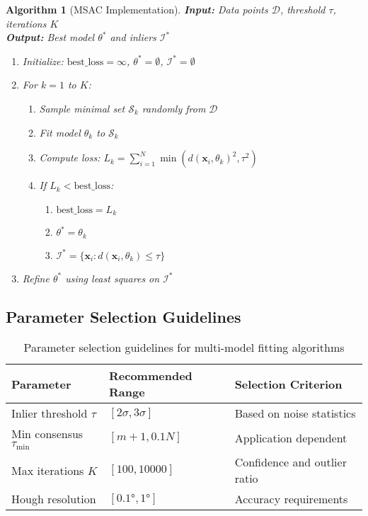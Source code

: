 \documentclass[12pt]{article}
\renewcommand{\vec}[1]{\mathbf{#1}}
\newtheorem{algorithm}[theorem]{Algorithm}
\begin{document}
\begin{algorithm}[MSAC Implementation]
    \label{alg:msac_detailed}
    \textbf{Input:} Data points $\mathcal{D}$, threshold $\tau$, iterations $K$\\
    \textbf{Output:} Best model $\theta^*$ and inliers $\mathcal{I}^*$
    \begin{enumerate}
        \item Initialize: $\text{best\_loss} = \infty$, $\theta^* = \emptyset$, $\mathcal{I}^* = \emptyset$
        \item For $k = 1$ to $K$:
              \begin{enumerate}
                  \item Sample minimal set $\mathcal{S}_k$ randomly from $\mathcal{D}$
                  \item Fit model $\theta_k$ to $\mathcal{S}_k$
                  \item Compute loss: $L_k = \sum_{i=1}^N \min(d(\vec{x}_i, \theta_k)^2, \tau^2)$
                  \item If $L_k < \text{best\_loss}$:
                        \begin{enumerate}
                            \item $\text{best\_loss} = L_k$
                            \item $\theta^* = \theta_k$
                            \item $\mathcal{I}^* = \{\vec{x}_i : d(\vec{x}_i, \theta_k) \leq \tau\}$
                        \end{enumerate}
              \end{enumerate}
        \item Refine $\theta^*$ using least squares on $\mathcal{I}^*$
    \end{enumerate}
\end{algorithm}

\subsection{Parameter Selection Guidelines}
\label{app:parameter_guidelines}

\begin{table}[h]
    \centering
    \begin{tabular}{lll}
        \toprule
        \textbf{Parameter}          & \textbf{Recommended Range} & \textbf{Selection Criterion} \\
        \midrule
        Inlier threshold $\tau$     & $[2\sigma, 3\sigma]$       & Based on noise statistics    \\
        Min consensus $\tau_{\min}$ & $[m+1, 0.1N]$              & Application dependent        \\
        Max iterations $K$          & $[100, 10000]$             & Confidence and outlier ratio \\
        Hough resolution            & $[0.1°, 1°]$               & Accuracy requirements        \\
        \bottomrule
    \end{tabular}
    \caption{Parameter selection guidelines for multi-model fitting algorithms}
    \label{tab:parameter_guidelines}
\end{table}
\end{document}
